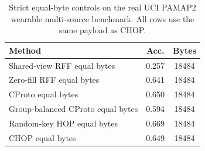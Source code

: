 \begin{table}[t]
\centering
\caption{Strict equal-byte controls on the real UCI PAMAP2 wearable multi-source benchmark. All rows use the same payload as CHOP.}
\label{tab:strict-equal-byte-pamap2}
\begin{tabular}{lcc}
\toprule
Method & Acc. & Bytes \\
\midrule
Shared-view RFF equal bytes & 0.257 & 18484 \\
Zero-fill RFF equal bytes & 0.641 & 18484 \\
CProto equal bytes & 0.650 & 18484 \\
Group-balanced CProto equal bytes & 0.594 & 18484 \\
Random-key HOP equal bytes & 0.669 & 18484 \\
CHOP equal bytes & 0.649 & 18484 \\
\bottomrule
\end{tabular}
\end{table}
